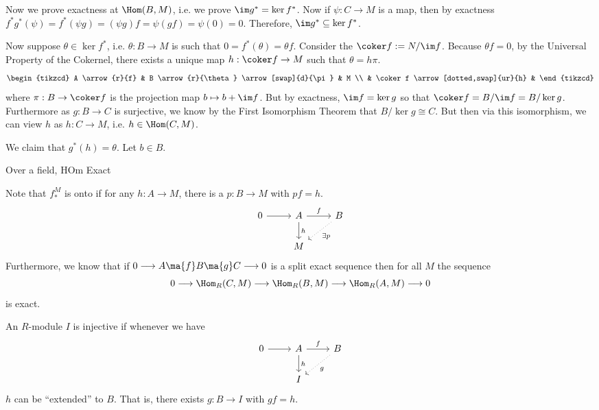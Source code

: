 Now we prove exactness at $\Hom(B,M)$, i.e. we prove $\im g^* = \ker f^*$. Now if $\psi: C \to M$ is a map, then by exactness $f^*g^*(\psi)= f^*(\psi g)= (\psi g)f= \psi (gf)= \psi(0)= 0$. Therefore, $\im g^* \subseteq \ker f^*$. 

Now suppose $\theta \in \ker f^*$, i.e. $\theta: B \to M$ is such that $0= f^*(\theta)= \theta f$. Consider the $\coker f:= N/\im f$. Because $\theta f= 0$, by the Universal Property of the Cokernel, there exists a unique map $h: \coker f \to M$ such that $\theta= h \pi$. 
	\[
	\begin{tikzcd}
	A \arrow{r}{f} & B \arrow{r}{\theta} \arrow[swap]{d}{\pi} & M \\
	& \coker f \arrow[dotted,swap]{ur}{h} & 
	\end{tikzcd}
	\]
where $\pi: B \to \coker f$ is the projection map $b \mapsto b + \im f$. But by exactness, $\im f= \ker g$ so that $\coker f= B/\im f= B/\ker g$. Furthermore as $g: B \to C$ is surjective, we know by the First Isomorphism Theorem that $B/\ker g \cong C$. But then via this isomorphism, we can view $h$ as $h: C \to M$, i.e. $h \in \Hom(C,M)$.




We claim that $g^*(h)= \theta$. Let $b \in B$. 





\newpage

Over a field, HOm Exact






Note that $f_*^M$ is onto if for any $h: A \rightarrow M$, there is a $p: B \rightarrow M$ with $pf=h$. 
\[
\begin{tikzcd}
0 \arrow{r} & A \arrow{r}{f} \arrow{d}{h} & B \arrow[dotted]{dl}{\exists p}\\
 & M & 
\end{tikzcd}
\]
Furthermore, we know that if $0 \longrightarrow A \ma{f} B \ma{g} C \longrightarrow 0$ is a split exact sequence then for all $M$ the sequence 
\[
0 \longrightarrow \Hom_R(C,M) \longrightarrow \Hom_R(B,M) \longrightarrow \Hom_R(A,M) \longrightarrow 0
\]
is exact. 

\begin{dfn}
An $R$-module $I$ is injective if whenever we have
\[
\begin{tikzcd}
0 \arrow{r} & A \arrow{r}{f} \arrow{d}{h} & B \arrow[dotted]{dl}{g} \\
& I & 
\end{tikzcd}
\]
$h$ can be ``extended'' to $B$. That is, there exists $g: B \rightarrow I$ with $gf=h$. 
\end{dfn}

